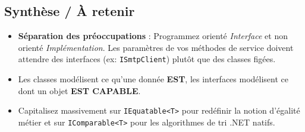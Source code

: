 \subsection{Synthèse / À retenir}

\begin{itemize}
    \item \textbf{Séparation des préoccupations} : Programmez orienté \textit{Interface} et non orienté \textit{Implémentation}. Les paramètres de vos méthodes de service doivent attendre des interfaces (ex: \texttt{ISmtpClient}) plutôt que des classes figées.
    \item Les classes modélisent ce qu'une donnée \textbf{EST}, les interfaces modélisent ce dont un objet \textbf{EST CAPABLE}.
    \item Capitalisez massivement sur \texttt{IEquatable<T>} pour redéfinir la notion d'égalité métier et sur \texttt{IComparable<T>} pour les algorithmes de tri .NET natifs.
\end{itemize}
